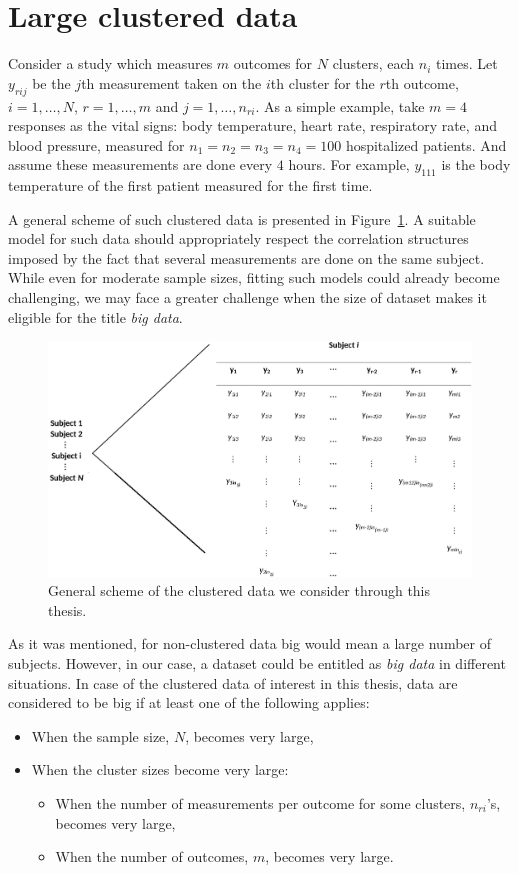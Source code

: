 \documentclass[11pt,a5paper,twoside]{book}
\begin{document}
\section{Large clustered data}

Consider a study which measures $m$ outcomes for $N$ clusters, each $n_i$ times. Let $y_{rij}$ be the $j$th measurement taken on the $i$th cluster for the $r$th outcome, $i=1,\ldots,N$, $r=1,\ldots,m$ and $j=1,\ldots,n_{ri}$. As a simple example, take $m=4$ responses as the vital signs: body temperature, heart rate, respiratory rate, and blood pressure, measured for $n_1 = n_2 = n_3 = n_4 = 100$ hospitalized patients. And assume these measurements are done every $4$ hours. For example, $y_{111}$ is the body temperature of the first patient measured for the first time. 

A general scheme of such clustered data is presented in Figure~\ref{fig_scheme}. A suitable model for such data should appropriately respect the correlation structures imposed by the fact that several measurements are done on the same subject. While even for moderate sample sizes, fitting such models could already become challenging, we may face a greater challenge when the size of dataset makes it eligible for the title \emph{big data}. 

\begin{figure}
\centering
\includegraphics[width=\textwidth]{scheme_new.eps}
\caption{General scheme of the clustered data we consider through this thesis.} 
\label{fig_scheme}
\end{figure} 


As it was mentioned, for non-clustered data big would mean a large number of subjects. However, in our case, a dataset could be entitled as \emph{big data} in different situations. In case of the clustered data of interest in this thesis, data are considered to be big if at least one of the following applies:
\begin{itemize}
\item When the sample size, $N$, becomes very large,
\item When the cluster sizes become very large:
\begin{itemize}
\item When the number of measurements per outcome for some clusters, $n_{ri}$'s, becomes very large,
\item When the number of outcomes, $m$, becomes very large.
\end{itemize}
\end{itemize}
\end{document}
